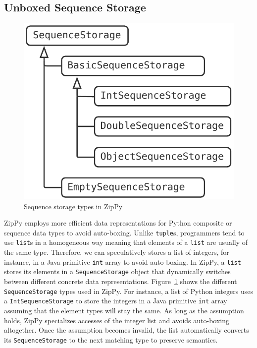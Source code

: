 \subsection{Unboxed Sequence Storage}

\begin{figure}[ht]
\centering
\includegraphics[scale=.5]{figures/ch3-sequence-storage-types.pdf}
\caption{Sequence storage types in ZipPy}
\label{fig:sequence-storage-types}
\end{figure}

ZipPy employs more efficient data representations for Python composite or sequence data types to avoid auto-boxing.
Unlike \texttt{tuple}s, programmers tend to use \texttt{list}s in a homogeneous way meaning that elements of a \texttt{list} are usually of the same type.
Therefore, we can speculatively stores a list of integers, for instance, in a Java primitive \texttt{int} array to avoid auto-boxing.
In ZipPy, a \texttt{list} stores its elements in a \texttt{SequenceStorage} object that dynamically switches between different concrete data representations.
Figure~\ref{fig:sequence-storage-types} shows the different \texttt{SequenceStorage} types used in ZipPy.
For instance, a list of Python integers uses a \texttt{IntSequenceStorage} to store the integers in a Java primitive \texttt{int} array assuming that the element types will stay the same.
As long as the assumption holds, ZipPy specializes accesses of the integer list and avoids auto-boxing altogether.
Once the assumption becomes invalid, the list automatically converts its \texttt{SequenceStorage} to the next matching type to preserve semantics.

